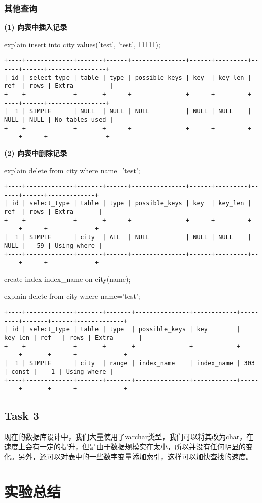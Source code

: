 \documentclass[a4paper, 11pt, nofonts, nocap, fancyhdr]{ctexart}
\begin{document}
\subsubsection{其他查询}

\textbf{(1) 向表中插入记录} 

explain insert into city values('test', 'test', 11111);

\begin{verbatim}
+----+-------------+-------+------+---------------+------+---------+------+------+----------------+
| id | select_type | table | type | possible_keys | key  | key_len | ref  | rows | Extra          |
+----+-------------+-------+------+---------------+------+---------+------+------+----------------+
|  1 | SIMPLE      | NULL  | NULL | NULL          | NULL | NULL    | NULL | NULL | No tables used |
+----+-------------+-------+------+---------------+------+---------+------+------+----------------+
\end{verbatim}

\vspace{0.7cm}

\textbf{(2) 向表中删除记录} 

explain delete from city where name='test';

\begin{verbatim}
+----+-------------+-------+------+---------------+------+---------+------+------+-------------+
| id | select_type | table | type | possible_keys | key  | key_len | ref  | rows | Extra       |
+----+-------------+-------+------+---------------+------+---------+------+------+-------------+
|  1 | SIMPLE      | city  | ALL  | NULL          | NULL | NULL    | NULL |   59 | Using where |
+----+-------------+-------+------+---------------+------+---------+------+------+-------------+
\end{verbatim}

create index index\_name on city(name);

explain delete from city where name='test';

\begin{verbatim}
+----+-------------+-------+-------+---------------+------------+---------+-------+------+-------------+
| id | select_type | table | type  | possible_keys | key        | key_len | ref   | rows | Extra       |
+----+-------------+-------+-------+---------------+------------+---------+-------+------+-------------+
|  1 | SIMPLE      | city  | range | index_name    | index_name | 303     | const |    1 | Using where |
+----+-------------+-------+-------+---------------+------------+---------+-------+------+-------------+
\end{verbatim}

\subsection{Task 3}

现在的数据库设计中，我们大量使用了varchar类型，我们可以将其改为char，在速度上会有一定的提升，但是由于数据规模实在太小，所以并没有任何明显的变化。另外，还可以对表中的一些数字变量添加索引，这样可以加快查找的速度。

\section{实验总结}
\end{document}
